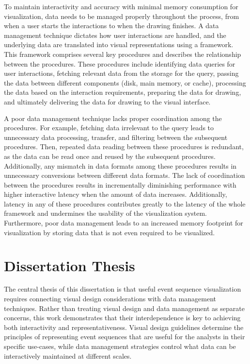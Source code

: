 \begin{refsection}
To maintain interactivity and accuracy with minimal memory consumption for visualization, data needs to be managed properly throughout the process, from when a user starts the interactions to when the drawing finishes. A data management technique dictates how user interactions are handled, and the underlying data are translated into visual representations using a framework. This framework comprises several key procedures and describes the relationship between the procedures. These procedures include identifying data queries for user interactions, fetching relevant data from the storage for the query, passing the data between different components (disk, main memory, or cache), processing the data based on the interaction requirements, preparing the data for drawing, and ultimately delivering the data for drawing to the visual interface. 

A poor data management technique lacks proper coordination among the procedures. For example, fetching data irrelevant to the query leads to unnecessary data processing, transfer, and filtering between the subsequent procedures. Then, repeated data reading between these procedures is redundant, as the data can be read once and reused by the subsequent procedures. Additionally, any mismatch in data formats among these procedures results in unnecessary conversions between different data formats. The lack of coordination between the procedures results in incrementally diminishing performance with higher interactive latency when the amount of data increases. Additionally, latency in any of these procedures contributes greatly to the latency of the whole framework and undermines the usability of the visualization system. Furthermore, poor data management leads to an increased memory footprint for visualization by storing data that is not even required to be visualized.

\section{Dissertation Thesis}
\label{sec:intro-claims}
The central thesis of this dissertation is that useful event sequence visualization requires connecting visual design considerations with data management techniques. Rather than treating visual design and data management as separate concerns, this work demonstrates that their interdependence is key to achieving both interactivity and representativeness. Visual design guidelines determine the principles of representing event sequences that are useful for the analysts in their specific use-cases, while data management strategies control what data can be interactively maintained at different scales. 


\end{refsection}
